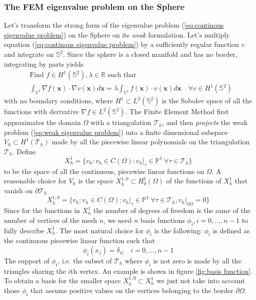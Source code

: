 \subsubsection{The FEM eigenvalue problem on the Sphere}\label{sec:Chapter3:FEM on the sphere}
Let's transform the strong form of the eigenvalue problem (\ref{eq:continous eigenvalue problem}) on the Sphere on its \textit{weak} formulation. Let's multiply equation (\ref{eq:continous eigenvalue problem}) by a sufficiently regular function $v$ and integrate on $\mathbb S^2$. Since the sphere is a closed manifold and has no border, integrating by parts yields
\begin{equation}\label{eq:weak eigenvalue problem}
\begin{split}
&\text{Find } f\in H^1(\mathbb S^2), \lambda\in\mathbb R\text{ such that }\\ 
&\int_{\mathbb S^2} \nabla f(\mathbf x)\cdot\nabla v(\mathbf x) d\mathbf x = \lambda \int_{\mathbb S^2} f(\mathbf x)\cdot v(\mathbf x)d\mathbf x\quad \forall v\in H^1(\mathbb S^2)
\end{split}
\end{equation}
with no boundary conditions, where $H^1\subset L^2(\mathbb S^2)$ is the Sobolev space of all the functions with derivative $\nabla f\in L^2(\mathbb S^2)$. The Finite Element Method first approximates the domain $\Omega$ with a triangulation $\mathcal T_h$, and then \textit{projects} the weak problem (\ref{eq:weak eigenvalue problem}) into a finite dimensional subspace $V_h\subset H^1(\mathcal T_h)$ made by all the piecewise linear polynomials on the triangulation $\mathcal T_h$. Define 
$$X_h^{1}=\{v_h: v_h\in C(\Omega): \left.v_h\right|_{\tau}\in\mathbb P^1\  \forall \tau\in \mathcal T_h\}$$
to be the space of all the continuous, piecewise linear functions on $\Omega$. A reasonable choice for $V_h$ is the space $X_h^{1,0}\subset H_0^1(\Omega)$ of the functions of $X_h^1$ that vanish on $\partial \mathcal T_h$
$$
X_h^{1,0}=\{v_h: v_h\in C(\Omega): \left.v_h\right|_{\tau}\in\mathbb P^1\  \forall \tau\in \mathcal T_h, \left.v_h\right|_{\partial\Omega}=0\}
$$ 
Since for the functions in $X_h^1$ the number of degrees of freedom is the same of the number of vertices of the mesh $n$, we need  $n$ basis functions $\phi_i, i=0,...,n-1$ to fully describe $X_h^{1}$. The most natural choice for $\phi_i$ is the following: $\phi_i$ is defined as the continuous piecewise linear function such that 
$$
\phi_i(x_j) = \delta_{ij}\quad i=0,...,n-1
$$
The support of $\phi_i$, i.e. the subset of $\mathcal T_h$ where $\phi_i$ is not zero is made by all the triangles sharing the $i$th vertex. An example is shown in figure \ref{fig:basis function}. To obtain a basis for the smaller space $X_h^{1,0}\subset X_h^{1}$ we just not take into account those $\phi_i$ that assume positive values on the vertices belonging to the border $\partial\Omega$. 

